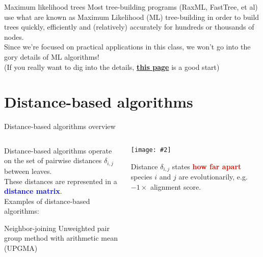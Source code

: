 \documentclass{beamer}
\renewcommand{\c}[1]{\begin{center}#1\end{center}}
\newcommand{\blu}[1]{\textcolor{blue}{\textbf{#1}}}
\newcommand{\red}[1]{\textcolor{red}{\textbf{#1}}}
\newcommand{\gr}[2][.95]{\c{\texttt{[image: \#2]}}}
\begin{document}
\begin{frame}{Maximum likelihood trees}
    Most tree-building programs (RaxML, FastTree, et al) use what are known as Maximum Likelihood (ML) tree-building in order to build trees quickly, efficiently and (relatively) accurately for hundreds or thousands of nodes.\\
    \bigskip
    Since we’re focused on practical applications in this class, we won’t go into the gory details of ML algorithms!\\
    \bigskip
    \footnotesize (If you really want to dig into the details, \blu{\href{https://scholarship.claremont.edu/cgi/viewcontent.cgi?article=1047&context=scripps_theses}{this page}} is a good start)
    \end{frame}

\section{Distance-based algorithms}
\begin{frame}{Distance-based algorithms overview}
    \begin{columns}
        \begin{column}{0.6\textwidth}
            Distance-based algorithms operate on the set of pairwise distances $\delta_{i,j}$ between leaves.\\
            \bigskip
            These distances are represented in a \blu{distance matrix}.\\
            \bigskip
            Examples of distance-based algorithms:
            \begin{outline}
                \1 Neighbor-joining
                \1 Unweighted pair group method with arithmetic mean (UPGMA)
            \end{outline}
        \end{column}
        \begin{column}{0.4\textwidth}
            \gr{l5_figs/s18_distance.png}
            Distance $\delta_{i,j}$ states \red{how far apart} species $i$ and $j$ are evolutionarily, e.g. $-1 \times$ alignment score. 
        \end{column}
    \end{columns}
\end{frame}
\end{document}
